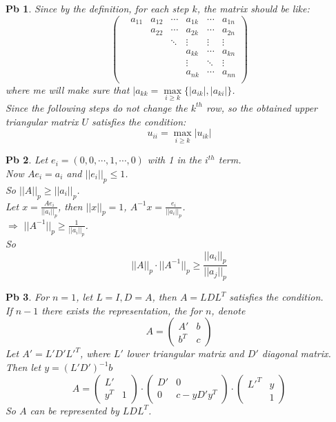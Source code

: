 \documentclass[a4paper,10pt]{article}
\newtheorem{num}{Pb}
\begin{document}
\begin{num}
    Since by the definition, for each step  $ k $, the matrix should be like:
   \[ \begin{pmatrix}
        &a_{11}&a_{12}&\cdots&a_{1k}&\cdots&a_{1n}\\
        & &a_{22}&\cdots&a_{2k}&\cdots &a_{2n}\\
        & &&\ddots&\vdots&\vdots&\vdots\\
        & & &&a_{kk}&\cdots &a_{kn}\\
        & & & &\vdots&\ddots&\vdots\\
        & & & &a_{nk}&\cdots&a_{nn}\\
    \end{pmatrix} \]
    where me will make sure that  $ |a_{kk}=\max\limits_{i \geq k}{\{|a_{ik}|,|a_{ki}|\}} $.\\
    Since the following steps do not change the  $ k^{th} $ row, so the obtained upper triangular matrix  $ U  $  satisfies the condition:
    \[u_{ii}=\max\limits_{i \geq k}{|u_{ik}|}\]  
\end{num}
\begin{num}
    Let  $ e_i=(0,0,\cdots ,1,\cdots ,0) $ with 1 in the  $ i^{th} $ term.\\
    Now  $ Ae_i=a_i $ and  $ ||e_i||_p \leq 1 $.\\
    So  $ ||A||_p  \geq ||a_i||_p $.\\
    Let  $ x=\frac{Ae_i}{||a_i||_p} $, then  $ ||x||_p=1 $, $ A^{-1}x=\frac{e_i}{||a_i||_p} $.\\
     $ \Rightarrow  $  $ ||A^{-1}||_p \geq \frac{1 }{||a_i||_p} $.\\
     So 
     \[||A||_p\cdot||A^{-1}||_p \geq \frac{||a_i||_p}{||a_j||_p}\]        
\end{num}
\begin{num}
    For  $ n=1 $, let  $ L=I,D=A $, then  $ A=LDL^T $ satisfies the condition.\\
    If  $ n-1 $ there exists the representation, the for  $ n $, denote
    \[
        A=\begin{pmatrix}
            A'&b\\
            b^T&c
        \end{pmatrix}
    \] 
    Let $ A'=L'D'L'^T $, where  $ L' $ lower triangular  matrix and  $ D'  $ diagonal matrix.\\
    Then let  $ y=(L'D')^{-1}b $ 
    \[A=\begin{pmatrix}
        L'&\\
        y^T&1
    \end{pmatrix}\cdot
    \begin{pmatrix}
        D'&0\\
        0&c-yD'y^T
    \end{pmatrix}
    \cdot
    \begin{pmatrix}
        L'^T&y\\
        &1
    \end{pmatrix}
    \]
    So  $ A $ can be represented by $ LDL^T $. 
\end{num}
\end{document}
